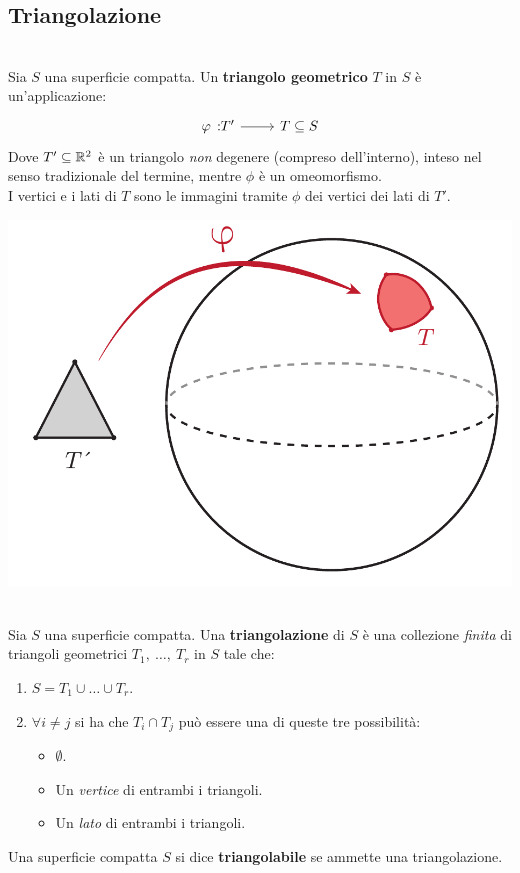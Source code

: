 \subsection{Triangolazione}
\begin{define}~{}\\
	Sia $S$ una superficie compatta. Un \textbf{triangolo geometrico} $T$ in $S$ è un'applicazione:
	\begin{equation}
		\funz{\phi}{T'}{T\subseteq S}
	\end{equation}
Dove $T'\subseteq \mathbb{R}^2$ è un triangolo \textit{non} degenere (compreso dell'interno), inteso nel senso tradizionale del termine, mentre $\phi$ è un omeomorfismo.\\
I vertici e i lati di $T$ sono le immagini tramite $\phi$ dei vertici dei lati di $T'$.
\begin{center}
	\includegraphics[trim=0cm 0cm 0cm 0cm, clip, scale=0.3]{images/spheretriangle.pdf}
\end{center}
\vspace{-6mm}
\end{define}
\begin{define}[Triangolazione.]~{}\\
	Sia $S$ una superficie compatta. Una \textbf{triangolazione} di $S$ è una collezione \textit{finita} di triangoli geometrici $T_1,\ \ldots,\ T_r$ in $S$ tale che:
	\begin{enumerate}
		\item $S=T_1\cup \ldots \cup T_r$.
		\item $\forall i\neq j$ si ha che $T_i\cap T_j$ può essere una di queste tre possibilità:
		\begin{itemize}
			\item $\emptyset$.
			\item Un \textit{vertice} di entrambi i triangoli.
			\item Un \textit{lato} di entrambi i triangoli.
		\end{itemize}
	\end{enumerate}
Una superficie compatta $S$ si dice \textbf{triangolabile} se ammette una triangolazione.
\end{define}
